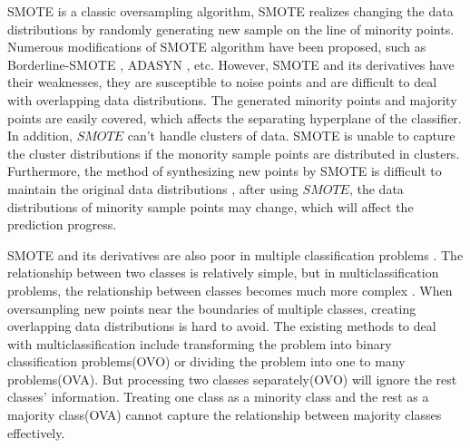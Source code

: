 \documentclass[ida]{iosart2x}
\begin{document}
SMOTE is a classic oversampling algorithm,
SMOTE realizes changing the data distributions by randomly generating new sample 
on the line of minority points.
Numerous modifications of SMOTE algorithm have been proposed, such as
Borderline-SMOTE \cite{2005Borderline}, ADASYN \cite{2008ADASYN}, etc. 
However, SMOTE and its derivatives have their weaknesses,
they are susceptible to noise points and are difficult to deal with
 overlapping data distributions.
The generated minority points and majority points are easily covered, 
which affects the separating hyperplane of the classifier. 
In addition, $SMOTE$ can't handle
clusters of data. SMOTE is unable to capture the cluster distributions
if the monority sample points are distributed in clusters.
Furthermore,
the method of synthesizing new points by SMOTE is difficult to 
maintain the original data distributions \cite{2008DATA},
after using $SMOTE$, 
the data distributions of minority sample points may change,
which will affect the prediction progress.


 SMOTE and its derivatives are also poor in multiple classification problems \cite{2020Combined}. 
 The relationship between two classes is relatively simple,
but in multiclassification problems, the relationship 
between classes becomes much more complex \cite{2017Relevance}.
When oversampling new points near the boundaries of multiple classes, 
creating overlapping data distributions \cite{Jierui2013Overlapping} is hard to avoid.
The existing methods to deal with multiclassification include transforming 
the problem into binary classification problems(OVO) \cite{articlemulti} or 
dividing the problem into one to many problems(OVA).
But processing two classes separately(OVO) will ignore the rest classes' information.
Treating one class as a minority class and the rest as a majority class(OVA)
cannot capture the relationship between majority classes effectively.
\end{document}
